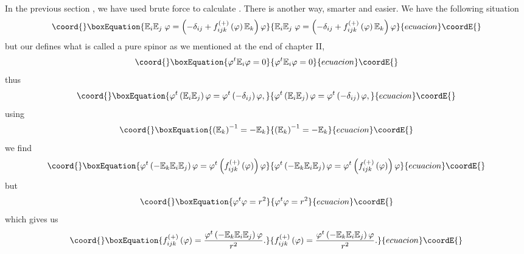 \documentclass[a4paper,12pt]{book}
\begin{document}
In the previous section , we have used brute force to calculate \coordHE{}. There is another way,
smarter and easier. We have the following situation 
\begin{equation}\coord{}\boxEquation{
\Bbb{E}_{i}\Bbb{E}_{j}\;\varphi =\left( -\delta _{ij}+f_{ijk}^{\left(
+\right) }\left( \varphi \right) \Bbb{E}_{k}\right) \varphi
}{
\Bbb{E}_{i}\Bbb{E}_{j}\;\varphi =\left( -\delta _{ij}+f_{ijk}^{\left(
+\right) }\left( \varphi \right) \Bbb{E}_{k}\right) \varphi
}{ecuacion}\coordE{}\end{equation}
but our \coordHE{} defines what is called a pure spinor as we mentioned
at the end of chapter II, 
\begin{equation}\coord{}\boxEquation{
\varphi ^{t}\Bbb{E}_{i}\varphi =0
}{
\varphi ^{t}\Bbb{E}_{i}\varphi =0
}{ecuacion}\coordE{}\end{equation}
thus 
\begin{equation}\coord{}\boxEquation{
\varphi ^{t}\left( \Bbb{E}_{i}\Bbb{E}_{j}\right) \varphi =\varphi ^{t}\left(
-\delta _{ij}\right) \varphi ,
}{
\varphi ^{t}\left( \Bbb{E}_{i}\Bbb{E}_{j}\right) \varphi =\varphi ^{t}\left(
-\delta _{ij}\right) \varphi ,
}{ecuacion}\coordE{}\end{equation}
using 
\begin{equation}\coord{}\boxEquation{
\left( \Bbb{E}_{k}\right) ^{-1}=-\Bbb{E}_{k}
}{
\left( \Bbb{E}_{k}\right) ^{-1}=-\Bbb{E}_{k}
}{ecuacion}\coordE{}\end{equation}
we find 
\begin{equation}\coord{}\boxEquation{
\varphi ^{t}\left( -\Bbb{E}_{k}\Bbb{E}_{i}\Bbb{E}_{j}\right) \varphi
=\varphi ^{t}\left( f_{ijk}^{\left( +\right) }\left( \varphi \right) \right)
\varphi
}{
\varphi ^{t}\left( -\Bbb{E}_{k}\Bbb{E}_{i}\Bbb{E}_{j}\right) \varphi
=\varphi ^{t}\left( f_{ijk}^{\left( +\right) }\left( \varphi \right) \right)
\varphi
}{ecuacion}\coordE{}\end{equation}
but 
\begin{equation}\coord{}\boxEquation{
\varphi ^{t}\varphi =r^{2}
}{
\varphi ^{t}\varphi =r^{2}
}{ecuacion}\coordE{}\end{equation}
which gives us 
\begin{equation}\coord{}\boxEquation{
f_{ijk}^{\left( +\right) }\left( \varphi \right) =\frac{\varphi ^{t}\left( -
\Bbb{E}_{k}\Bbb{E}_{i}\Bbb{E}_{j}\right) \varphi }{r^{2}}.
}{
f_{ijk}^{\left( +\right) }\left( \varphi \right) =\frac{\varphi ^{t}\left( -
\Bbb{E}_{k}\Bbb{E}_{i}\Bbb{E}_{j}\right) \varphi }{r^{2}}.
}{ecuacion}\coordE{}\end{equation}
\end{document}
